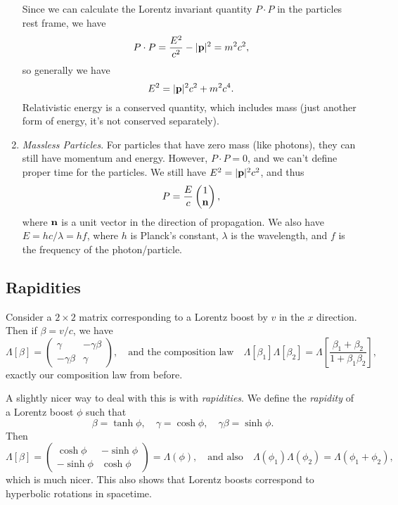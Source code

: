 \documentclass{scrartcl}
\theoremstyle{definition}
\begin{document}
\begin{enumerate}
Since we can calculate the Lorentz invariant quantity $P \cdot P$ in the particles rest frame, we have
$$
P \cdot P = \frac{E^2}{c^2} - |\mathbf{p}|^2 = m^2 c^2,
$$
so generally we have 
$$
E^2 = |\mathbf{p}|^2 c^2 + m^2 c^4.
$$
Relativistic energy is a conserved quantity, which includes mass (just another form of energy, it's not conserved separately).
\item \emph{Massless Particles}. For particles that have zero mass (like photons), they can still have momentum and energy. However, $P \cdot P = 0$, and we can't define proper time for the particles. We still have $E^2 = |\mathbf{p}|^2 c^2$, and thus
$$
P = \frac{E}{c} \begin{pmatrix}
	1 \\ \mathbf{n}
\end{pmatrix},
$$
where $\mathbf{n}$ is a unit vector in the direction of propagation. We also have $E = hc/\lambda = hf$, where $h$ is Planck's constant, $\lambda$ is the wavelength, and $f$ is the frequency of the photon/particle. 
\end{enumerate}

\subsection*{Rapidities}

Consider a $2 \times 2$ matrix corresponding to a Lorentz boost by $v$ in the $x$ direction. Then if $\beta = v/c$, we have
$$
\Lambda[\beta] = \begin{pmatrix}
	\gamma & -\gamma \beta \\
	-\gamma \beta & \gamma
\end{pmatrix}, \quad \text{and the composition law} \quad \Lambda[\beta_1] \Lambda[\beta_2] = \Lambda\left[\frac{\beta_1 + \beta_2}{1 + \beta_1 \beta_2}\right],
$$
exactly our composition law from before.

A slightly nicer way to deal with this is with \emph{rapidities}.
We define the \emph{rapidity} of a Lorentz boost $\phi$ such that
$$
\beta = \tanh \phi, \quad \gamma = \cosh \phi,\quad \gamma \beta = \sinh \phi.
$$
Then
$$
\Lambda[\beta] = \begin{pmatrix}
	\cosh \phi & - \sinh \phi \\
	-\sinh \phi & \cosh \phi 
\end{pmatrix} = \Lambda(\phi), \quad \text{and also} \quad \Lambda(\phi_1) \Lambda(\phi_2) = \Lambda(\phi_1 + \phi_2),
$$
which is much nicer. This also shows that Lorentz boosts correspond to hyperbolic rotations in spacetime.
\end{document}
